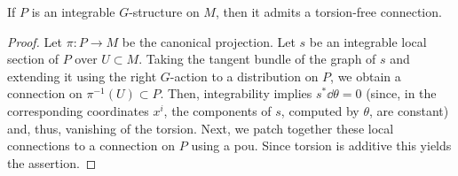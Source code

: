 \begin{prop}[{{\cite[Prop.~2.2.4]{RS2}}}]\label{prop 2.2.4 RS2}
    If $P$ is an integrable $G$-structure on $M$, then it admits a torsion-free connection.
\end{prop}
\begin{proof}
    Let $\pi:P\to M$ be the canonical projection. Let $s$ be an integrable local section of $P$ over $U\subset M$. Taking the tangent bundle of the graph of $s$ and extending it using the right $G$-action to a distribution on $P$, we obtain a connection on $\pi^{-1}(U)\subset P$. Then, integrability implies $s^\ast \dd\theta=0$ (since, in the corresponding coordinates $x^i$, the components of $s$, computed by $\theta$, are constant) and, thus, vanishing of the torsion. Next, we patch together these local connections to a connection on $P$ using a \gls{pou}. Since torsion is additive this yields the assertion.
\end{proof}

